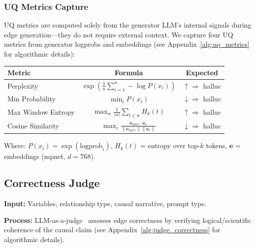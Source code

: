\subsubsection{UQ Metrics Capture}
\label{sec:uq_metrics_definition}

UQ metrics are computed solely from the generator LLM's internal signals during edge generation---they do not require external context. We capture four UQ metrics from generator logprobs and embeddings (see Appendix~\ref{alg:uq_metrics} for algorithmic details):

\begin{table}[H]
\centering
\footnotesize
\begin{tabular}{@{}lcc@{}}
\toprule
\textbf{Metric} & \textbf{Formula} & \textbf{Expected} \\
\midrule
Perplexity & $\displaystyle\exp\left(\frac{1}{n}\sum_{i=1}^{n} -\log P(x_i)\right)$ & $\uparrow \Rightarrow$ halluc \\[1.5ex]
Min Probability & $\displaystyle\min_i P(x_i)$ & $\downarrow \Rightarrow$ halluc \\[1.5ex]
Max Window Entropy & $\displaystyle\max_w \frac{1}{|w|} \sum_{t \in w} H_k(t)$ & $\uparrow \Rightarrow$ halluc \\[1.5ex]
Cosine Similarity & $\displaystyle\max_c \frac{\mathbf{e}_{narr} \cdot \mathbf{e}_c}{\|\mathbf{e}_{narr}\| \|\mathbf{e}_c\|}$ & $\downarrow \Rightarrow$ halluc \\
\bottomrule
\end{tabular}
\end{table}

Where: $P(x_i) = \exp(\text{logprob}_i)$, $H_k(t)$ = entropy over top-$k$ tokens, $\mathbf{e}$ = embeddings (mpnet, $d=768$).

\subsection{Correctness Judge}
\label{sec:correctness_judge}

\textbf{Input:} Variables, relationship type, causal narrative, prompt type.

\textbf{Process:} LLM-as-a-judge~\cite{zheng2024llmasajudge} assesses edge correctness by verifying logical/scientific coherence of the causal claim (see Appendix~\ref{alg:judge_correctness} for algorithmic details).

